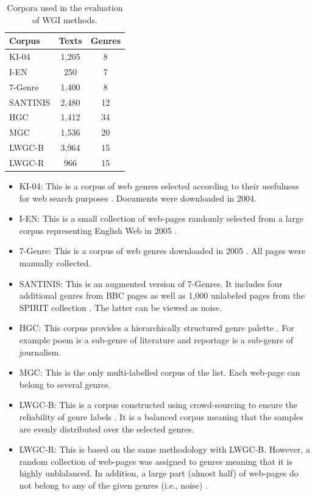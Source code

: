 \begin{table}[t]
	\center
	\caption {Corpora used in the evaluation of WGI methods.}\label{table:corpora}
	\begin{tabular}{lcc}
		\hline
		Corpus & Texts & Genres \\
		\hline
        KI-04 & 1,205 & 8 \\
        I-EN & 250 & 7 \\
        7-Genre & 1,400 & 8 \\
        SANTINIS & 2,480 & 12 \\
        HGC & 1,412 & 34 \\
        MGC & 1,536 & 20 \\
        LWGC-B & 3,964 & 15 \\
        LWGC-R & 966 & 15 \\
  		\hline
	\end{tabular}
\end{table}

\begin{itemize}
    \item KI-04: This is a corpus of web genres selected according to their usefulness for web search  purposes \parencite{meyer2004genre}. Documents were downloaded in 2004.
	\item I-EN: This is a small collection of web-pages randomly selected from a large corpus representing English Web in 2005 \parencite{sharoff2010inthegarden}.    
    \item 7-Genre: This is a corpus of web genres downloaded in 2005 \parencite{santini2007automatic}. All pages were manually collected. 
	\item SANTINIS: This is an augmented version of 7-Genres. It includes four additional genres from BBC pages as well as 1,000 unlabeled pages from the SPIRIT collection \parencite{joho2004spirit}. The latter can be viewed as noise.
	\item HGC: This corpus provides a hierarchically structured genre palette  \parencite{stubbe2007genre}. For example poem is a sub-genre of literature and reportage is a sub-genre of journalism.
    \item MGC: This is the only multi-labelled corpus of the list. Each web-page can belong to several genres. \parencite{Vidulin2007}
    \item LWGC-B: This is a corpus constructed using crowd-sourcing to ensure the reliability of genre labels \parencite{Asheghi2015}. It is a balanced corpus meaning that the samples are evenly distributed over the selected genres.
    \item LWGC-R: This is based on the same methodology with LWGC-B. However, a random collection of web-pages was assigned to genres meaning that it is highly unblalanced. In addition, a large part (almost half) of web-pages do not belong to any of the given genres (i.e., noise) \parencite{Asheghi2015}.
\end{itemize}

